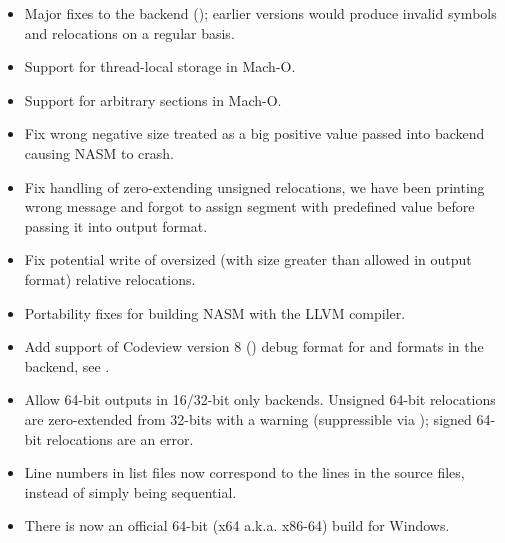 \begin{itemize}
    \item{Major fixes to the  backend (); earlier versions
        would produce invalid symbols and relocations on a regular basis.}

    \item{Support for thread-local storage in Mach-O.}

    \item{Support for arbitrary sections in Mach-O.}

    \item{Fix wrong negative size treated as a big positive value passed into
        backend causing NASM to crash.}

    \item{Fix handling of zero-extending unsigned relocations, we have been printing
        wrong message and forgot to assign segment with predefined value before
        passing it into output format.}

    \item{Fix potential write of oversized (with size greater than allowed in
        output format) relative relocations.}

    \item{Portability fixes for building NASM with the LLVM compiler.}

    \item{Add support of Codeview version 8 () debug format for
         and  formats in the  backend,
        see .}

    \item{Allow 64-bit outputs in 16/32-bit only backends. Unsigned 64-bit
        relocations are zero-extended from 32-bits with a warning
        (suppressible via ); signed 64-bit relocations are
        an error.}

    \item{Line numbers in list files now correspond to the lines in the source
        files, instead of simply being sequential.}

    \item{There is now an official 64-bit (x64 a.k.a. x86-64) build for Windows.}
\end{itemize}


